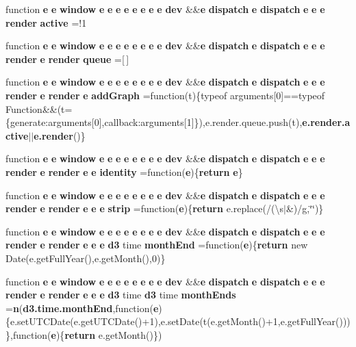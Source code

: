 \begin{DoxyCompactItemize}
\item 
function {\bf e} {\bf e} {\bf window} {\bf e} {\bf e} {\bf e} {\bf e} {\bf e} {\bf e} {\bf e} {\bf e} {\bf dev} \&\&{\bf e} {\bf dispatch} {\bf e} {\bf dispatch} {\bf e} {\bf e} {\bf e} {\bf render} {\bf active} =!1
\item 
function {\bf e} {\bf e} {\bf window} {\bf e} {\bf e} {\bf e} {\bf e} {\bf e} {\bf e} {\bf e} {\bf e} {\bf dev} \&\&{\bf e} {\bf dispatch} {\bf e} {\bf dispatch} {\bf e} {\bf e} {\bf e} {\bf render} {\bf e} {\bf render} {\bf queue} =[$\,$]
\item 
function {\bf e} {\bf e} {\bf window} {\bf e} {\bf e} {\bf e} {\bf e} {\bf e} {\bf e} {\bf e} {\bf e} {\bf dev} \&\&{\bf e} {\bf dispatch} {\bf e} {\bf dispatch} {\bf e} {\bf e} {\bf e} {\bf render} {\bf e} {\bf render} {\bf e} {\bf add\+Graph} =function(t)\{typeof arguments[0]==typeof Function\&\&(t=\{generate\+:arguments[0],callback\+:arguments[1]\}),e.\+render.\+queue.\+push(t),{\bf e.\+render.\+active}$\vert$$\vert${\bf e.\+render}()\}
\item 
function {\bf e} {\bf e} {\bf window} {\bf e} {\bf e} {\bf e} {\bf e} {\bf e} {\bf e} {\bf e} {\bf e} {\bf dev} \&\&{\bf e} {\bf dispatch} {\bf e} {\bf dispatch} {\bf e} {\bf e} {\bf e} {\bf render} {\bf e} {\bf render} {\bf e} {\bf e} {\bf identity} =function({\bf e})\{{\bf return} {\bf e}\}
\item 
function {\bf e} {\bf e} {\bf window} {\bf e} {\bf e} {\bf e} {\bf e} {\bf e} {\bf e} {\bf e} {\bf e} {\bf dev} \&\&{\bf e} {\bf dispatch} {\bf e} {\bf dispatch} {\bf e} {\bf e} {\bf e} {\bf render} {\bf e} {\bf render} {\bf e} {\bf e} {\bf e} {\bf strip} =function({\bf e})\{{\bf return} e.\+replace(/(\textbackslash{}s$\vert$\&)/g,\char`\"{}\char`\"{})\}
\item 
function {\bf e} {\bf e} {\bf window} {\bf e} {\bf e} {\bf e} {\bf e} {\bf e} {\bf e} {\bf e} {\bf e} {\bf dev} \&\&{\bf e} {\bf dispatch} {\bf e} {\bf dispatch} {\bf e} {\bf e} {\bf e} {\bf render} {\bf e} {\bf render} {\bf e} {\bf e} {\bf e} {\bf d3} time {\bf month\+End} =function({\bf e})\{{\bf return} new Date(e.\+get\+Full\+Year(),e.\+get\+Month(),0)\}
\item 
function {\bf e} {\bf e} {\bf window} {\bf e} {\bf e} {\bf e} {\bf e} {\bf e} {\bf e} {\bf e} {\bf e} {\bf dev} \&\&{\bf e} {\bf dispatch} {\bf e} {\bf dispatch} {\bf e} {\bf e} {\bf e} {\bf render} {\bf e} {\bf render} {\bf e} {\bf e} {\bf e} {\bf d3} time {\bf d3} time {\bf month\+Ends} ={\bf n}({\bf d3.\+time.\+month\+End},function({\bf e})\{e.\+set\+U\+T\+C\+Date(e.\+get\+U\+T\+C\+Date()+1),e.\+set\+Date(t(e.\+get\+Month()+1,e.\+get\+Full\+Year()))\},function({\bf e})\{{\bf return} e.\+get\+Month()\})
$$
\end{DoxyCompactItemize}
